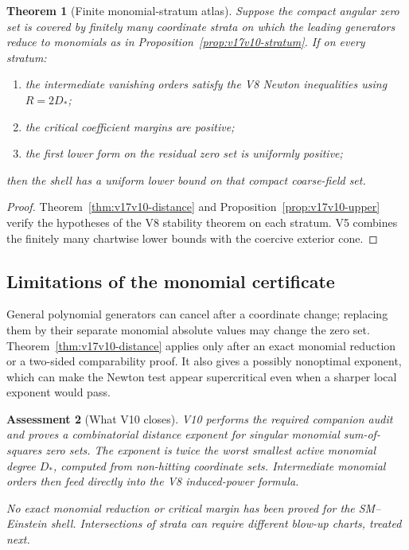 \documentclass[11pt]{article}
\newtheorem{theorem}{Theorem}[section]
\newtheorem{assessment}[theorem]{Assessment}
\theoremstyle{remark}
\begin{document}
\begin{theorem}[Finite monomial-stratum atlas]
\label{thm:v17v10-atlas}
Suppose the compact angular zero set is covered by finitely many
coordinate strata on which the leading generators reduce to
monomials as in Proposition~\ref{prop:v17v10-stratum}.  If on every
stratum:
\begin{enumerate}
\item the intermediate vanishing orders satisfy the V8 Newton
      inequalities using \(R=2D_*\);
\item the critical coefficient margins are positive;
\item the first lower form on the residual zero set is uniformly
      positive;
\end{enumerate}
then the shell has a uniform lower bound on that compact
coarse-field set.
\end{theorem}

\begin{proof}
Theorem~\ref{thm:v17v10-distance} and
Proposition~\ref{prop:v17v10-upper} verify the hypotheses of the V8
stability theorem on each stratum.  V5 combines the finitely many
chartwise lower bounds with the coercive exterior cone.
\end{proof}

\subsection{Limitations of the monomial certificate}

General polynomial generators can cancel after a coordinate change;
replacing them by their separate monomial absolute values may change
the zero set.  Theorem~\ref{thm:v17v10-distance} applies only after an
exact monomial reduction or a two-sided comparability proof.  It also
gives a possibly nonoptimal exponent, which can make the Newton test
appear supercritical even when a sharper local exponent would pass.

\begin{assessment}[What V10 closes]
\label{ass:v17v10-status}
V10 performs the required companion audit and proves a combinatorial
distance exponent for singular monomial sum-of-squares zero sets.
The exponent is twice the worst smallest active monomial degree
\(D_*\), computed from non-hitting coordinate sets.  Intermediate
monomial orders then feed directly into the V8 induced-power formula.

No exact monomial reduction or critical margin has been proved for
the SM--Einstein shell.  Intersections of strata can require
different blow-up charts, treated next.
\end{assessment}
\end{document}
